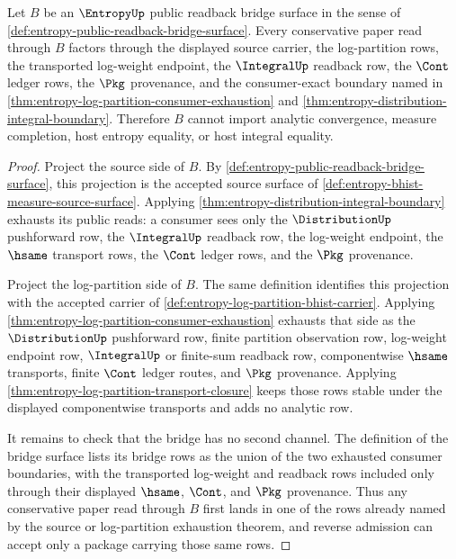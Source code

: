 \begin{theorem}
\label{thm:entropy-public-readback-bridge-boundary}
Let $B$ be an $\EntropyUp$ public readback bridge surface in the sense of \autoref{def:entropy-public-readback-bridge-surface}. Every conservative paper read through $B$ factors through the displayed source carrier, the log-partition rows, the transported log-weight endpoint, the $\IntegralUp$ readback row, the $\Cont$ ledger rows, the $\Pkg$ provenance, and the consumer-exact boundary named in \autoref{thm:entropy-log-partition-consumer-exhaustion} and \autoref{thm:entropy-distribution-integral-boundary}. Therefore $B$ cannot import analytic convergence, measure completion, host entropy equality, or host integral equality.
\end{theorem}
\begin{proof}
Project the source side of $B$. By \autoref{def:entropy-public-readback-bridge-surface}, this projection is the accepted source surface of \autoref{def:entropy-bhist-measure-source-surface}. Applying \autoref{thm:entropy-distribution-integral-boundary} exhausts its public reads: a consumer sees only the $\DistributionUp$ pushforward row, the $\IntegralUp$ readback row, the log-weight endpoint, the $\hsame$ transport rows, the $\Cont$ ledger rows, and the $\Pkg$ provenance.

Project the log-partition side of $B$. The same definition identifies this projection with the accepted carrier of \autoref{def:entropy-log-partition-bhist-carrier}. Applying \autoref{thm:entropy-log-partition-consumer-exhaustion} exhausts that side as the $\DistributionUp$ pushforward row, finite partition observation row, log-weight endpoint row, $\IntegralUp$ or finite-sum readback row, componentwise $\hsame$ transports, finite $\Cont$ ledger routes, and $\Pkg$ provenance. Applying \autoref{thm:entropy-log-partition-transport-closure} keeps those rows stable under the displayed componentwise transports and adds no analytic row.

It remains to check that the bridge has no second channel. The definition of the bridge surface lists its bridge rows as the union of the two exhausted consumer boundaries, with the transported log-weight and readback rows included only through their displayed $\hsame$, $\Cont$, and $\Pkg$ provenance. Thus any conservative paper read through $B$ first lands in one of the rows already named by the source or log-partition exhaustion theorem, and reverse admission can accept only a package carrying those same rows.


\end{proof}
